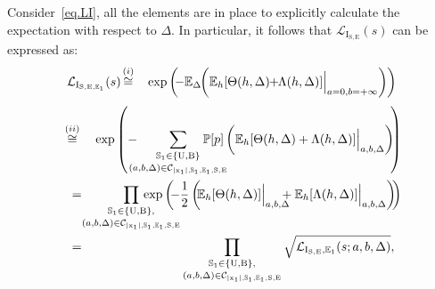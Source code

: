 \documentclass[10pt,journal,a4paper]{IEEEtran}
\begin{document}
Consider~\eqref{eq.LI}, all the elements are in place to explicitly calculate the expectation with respect to $\Delta$. In particular, it follows that $\mathcal{L}_{\mathrm{I}_{\mathrm{S,E}}}(s)$ can be expressed as: 
\setlength{\arraycolsep}{0.0em}
\begin{eqnarray}
	\mathcal{L}_{\mathrm{I}_{\mathrm{S,E},\mathbb{E}_1}}(s) \hspace{-0.5mm}&{}\stackrel{(i)}{\cong}{}& \hspace{-0.5mm}\exp \left(\hspace{-1mm} - \mathbb{E}_\Delta\hspace{-1mm}\left(\mathbb{E}_h [\Theta(h,\Delta) \hspace{-1mm}+\hspace{-1mm} \Lambda(h,\Delta)]\Big|_{a = 0,b = +\infty}\right)\hspace{-0.1mm}\right)\nonumber
\end{eqnarray}
\begin{eqnarray}	
&{}\hspace{-2mm}\stackrel{(ii)}{\cong}{}{}& \exp \left( - \hspace{-3mm}\mathop{\sum_{\mathbb{S}_1\in\{\mathrm{U,B}\}}}_{(a,b,\Delta) \in \mathcal{C}_{\mathrm{|x_1|,\mathbb{S}_1,\mathbb{E}_1,S,E}}} \hspace{-7.5mm}\mathbb{P}[p]\left(\mathbb{E}_h [\Theta(h,\Delta) + \Lambda(h,\Delta)]\Big|_{a,b,\Delta}\right)\hspace{-1mm}\right)\nonumber\hspace{-2mm}\\
&=& \hspace{-4mm}\mathop{\mathop{\mathop{\prod_{\mathbb{S}_1\in\{\mathrm{U,B}\},}}}_{(a,b,\Delta) \in \mathcal{C}_{\mathrm{|x_1|,\mathbb{S}_1,\mathbb{E}_1,S,E}}}} \hspace{-10mm} \hspace{-1mm}\exp \left( \hspace{-1mm}- \frac{1}{2}\left(\hspace{-1mm}\mathbb{E}_h [\Theta(h,\Delta)]\Big|_{a,b,\Delta} \hspace{-3mm}+ \mathbb{E}_h [\Lambda(h,\Delta)]\Big|_{a,b,\Delta}\right)\hspace{-1mm}\right)\nonumber\hspace{-2mm}\\
&=&	\mathop{\mathop{\mathop{\prod_{\mathbb{S}_1\in\{\mathrm{U,B}\},}}}_{(a,b,\Delta) \in \mathcal{C}_{\mathrm{|x_1|,\mathbb{S}_1,\mathbb{E}_1,S,E}}}} \sqrt{\mathcal{L}_{\mathrm{I}_{\mathrm{S,E}},\mathbb{E}_1}(s;a,b,\Delta)},
\end{eqnarray}
\end{document}
